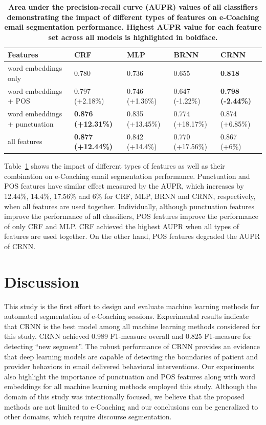 \documentclass{amia}
\begin{document}
\begin{table}[ht]
\centering
\caption{\textbf{Area under the precision-recall curve (AUPR) values of all classifiers demonstrating the impact of different types of features on e-Coaching email segmentation performance. Highest AUPR value for each feature set across all models is highlighted in boldface.}}
\label{tab:result_aupr}
 \begin{tabular}{|l|l|l|l|l|}
  \hline
\textbf{Features} & \textbf{CRF} & \textbf{MLP}  & \textbf{BRNN} & \textbf{CRNN} \\ \hline      
 word embeddings only & 0.780 & 0.736 & 0.655 & \textbf{0.818} \\ \hline
 word embeddings + POS & 0.797 (+2.18\%) & 0.746 (+1.36\%) & 0.647 (-1.22\%) & \textbf{0.798 (-2.44\%)} \\ \hline
 word embeddings + punctuation & \textbf{0.876 (+12.31\%)} & 0.835 (+13.45\%) & 0.774 (+18.17\%) & 0.874 (+6.85\%) \\ \hline
 all features & \textbf{0.877 (+12.44\%)} & 0.842 (+14.4\%) & 0.770 (+17.56\%) & 0.867 (+6\%) \\ \hline
  \end{tabular}
\end{table}     

Table~\ref{tab:result_aupr} shows the impact of different types of features as well as their combination on e-Coaching email segmentation performance. Punctuation and POS features have similar effect measured by the AUPR, which increases by 12.44\%, 14.4\%, 17.56\% and 6\% for CRF, MLP, BRNN and CRNN, respectively, when all features are used together. Individually, although punctuation features improve the performance of all classifiers, POS features improve the performance of only CRF and MLP. CRF achieved the highest AUPR when all types of features are used together. On the other hand, POS features degraded the AUPR of CRNN.

\section*{Discussion}
This study is the first effort to design and evaluate machine learning methods for automated segmentation of e-Coaching sessions. Experimental results indicate that CRNN is the best model among all machine learning methods considered for this study. CRNN achieved 0.989 F1-measure overall and 0.825 F1-measure for detecting ``new segment''. The robust performance of CRNN provides an evidence that deep learning models are capable of detecting the boundaries of patient and provider behaviors in email delivered behavioral interventions. Our experiments also highlight the importance of punctuation and POS features along with word embeddings for all machine learning methods employed this study. Although the domain of this study was intentionally focused, we believe that the proposed methods are not limited to e-Coaching and our conclusions can be generalized to other domains, which require discourse segmentation.
\end{document}
